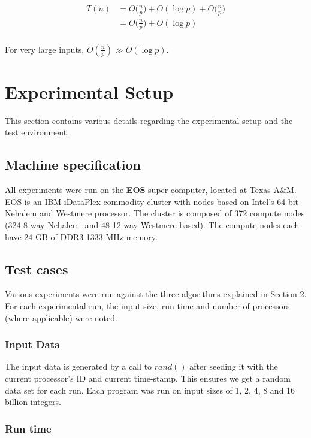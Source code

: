 \documentclass[11pt]{article}
\begin{document}
\begin{align*} 
T(n) &= O\bigg(\frac{n}{p}\bigg) + O(\log p) + O\bigg(\frac{n}{p}\bigg) \\ 
&= O\bigg(\frac{n}{p}\bigg) + O(\log p) \\
\end{align*}

For very large inputs, $O(\frac{n}{p}) \gg O(\log p)$.

\section{Experimental Setup}

This section contains various details regarding the experimental setup and the test environment.

\subsection{Machine specification}

All experiments were run on the \textbf{EOS} super-computer, located at Texas A\&M. EOS is an IBM iDataPlex commodity cluster with nodes based on Intel's 64-bit Nehalem and Westmere processor. The cluster is composed of 372 compute nodes (324 8-way Nehalem- and 48 12-way Westmere-based). The compute nodes each have 24 GB of DDR3 1333 MHz memory.

\subsection{Test cases}

Various experiments were run against the three algorithms explained in Section 2. For each experimental run, the input size, run time and number of processors (where applicable) were noted.

\subsubsection{Input Data}

The input data is generated by a call to $rand()$ after seeding it with the current processor's ID and current time-stamp. This ensures we get a random data set for each run. Each program was run on input sizes of 1, 2, 4, 8 and 16 billion integers.

\subsubsection{Run time}
\end{document}
